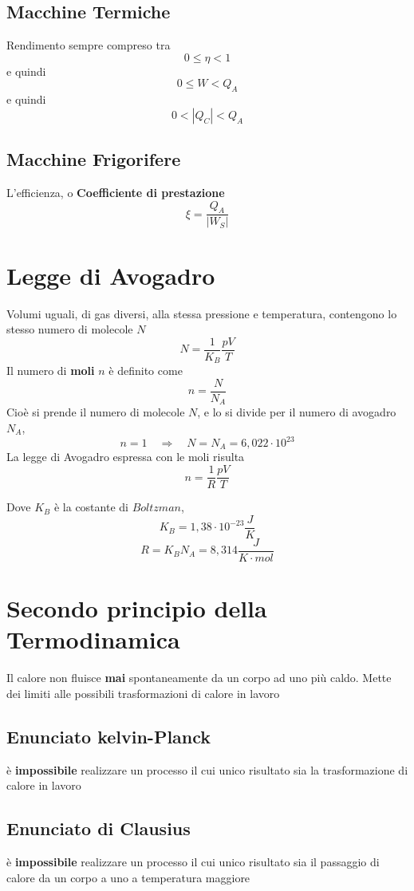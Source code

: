 \documentclass[a4paper]{report}
\begin{document}
  \subsection{Macchine Termiche}
  Rendimento sempre compreso tra
  \[0 \leq \eta < 1\]
  e quindi
  \[0 \leq W < Q_A \]
  e quindi
  \[ 0 < |Q_C| < Q_A \]
  \subsection {Macchine Frigorifere}
  L'efficienza, o \textbf{Coefficiente di prestazione}
  \[ \xi = \frac{Q_A}{|W_S|}  \]

  \section{Legge di Avogadro}
  Volumi uguali, di gas diversi, alla stessa pressione e temperatura, contengono lo stesso numero di molecole $N$
  \[ N = \frac{1}{K_B} \frac{pV}{T} \]
  Il numero di \textbf{moli} $n$ è definito come
  \[ n = \frac{N}{N_A} \]
  Cioè si prende il numero di molecole $N$, e lo si divide per il numero di avogadro $N_A$,
  \[ n = 1 \quad \Rightarrow \quad N = N_A = 6,022 \cdot 10^{23}\]
  La legge di Avogadro espressa con le moli risulta
  \[ n = \frac{1}{R} \frac{pV}{T} \]

  Dove $K_B$ è la costante di $Boltzman$,
  \[ K_B = 1,38 \cdot 10^{-23} \frac{J}{K}\]
  \[ R = K_B N_A = 8,314 \frac{J}{K \cdot mol} \]

  \section{Secondo principio della Termodinamica}
  Il calore non fluisce \textbf{mai} spontaneamente da un corpo ad uno più caldo.
  Mette dei limiti alle possibili trasformazioni di calore in lavoro
  \subsection{Enunciato kelvin-Planck}
  è \textbf{impossibile} realizzare un processo il cui unico risultato sia la trasformazione di calore in lavoro
  \subsection{Enunciato di Clausius}
  è \textbf{impossibile} realizzare un processo il cui unico risultato sia il passaggio di calore da un corpo a uno a temperatura maggiore
\end{document}
